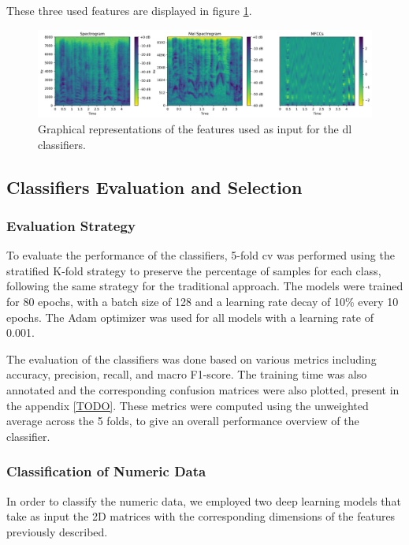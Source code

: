 These three used features are displayed in figure \ref{fig:dl_features}.

\begin{figure}[H]
	\centering
	\includegraphics[width=\textwidth]{figs/4_4_deep_learning/features.png}
	\caption{Graphical representations of the features used as input for the \ac{dl} classifiers.}
	\label{fig:dl_features}
\end{figure}



\subsection{Classifiers Evaluation and Selection}

\subsubsection{Evaluation Strategy}

To evaluate the performance of the classifiers, 5-fold \ac{cv} was performed using the stratified K-fold strategy to preserve the percentage of samples for each class, following the same strategy for the traditional approach. The models were trained for 80 epochs, with a batch size of 128 and a learning rate decay of 10\% every 10 epochs. The Adam optimizer was used for all models with a learning rate of 0.001.

The evaluation of the classifiers was done based on various metrics including accuracy, precision, recall, and macro F1-score. The training time was also annotated and the corresponding confusion matrices were also plotted, present in the appendix \ref{TODO}. These metrics were computed using the unweighted average across the 5 folds, to give an overall performance overview of the classifier.

\subsubsection{Classification of Numeric Data}

In order to classify the numeric data, we employed two deep learning models that take as input the 2D matrices with the corresponding dimensions of the features previously described.


